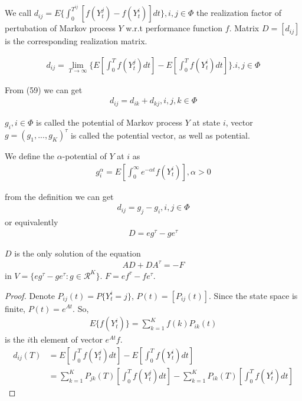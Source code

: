 \documentclass[runningheads]{llncs}
\begin{document}
    \begin{definition}
        We call $d_{ij} = E \{ \int_0^{T^{ij}} [ f(Y_t^j) - f(Y_t^i) ] dt \}, i, j \in \Phi$
        the realization factor of pertubation of Markov process $Y$ w.r.t performance function $f$.
        Matrix $D = [d_{ij}]$ is the corresponding realization matrix.
    \end{definition}

    \begin{lemma}
        \begin{align}
            d_{ij} = \mathop{\lim}_{T \rightarrow \infty} \{ E [ \int_0^T f(Y_t^j)dt ] -  E [ \int_0^T f(Y_t^i)dt ] \}. i, j \in \Phi
        \end{align}
    \end{lemma}
    \par
    From (59) we can get
    \begin{align}
        d_{ij} = d_{ik} + d_{kj}, i, j, k \in \Phi
    \end{align}
    \begin{definition}
        $g_i, i \in \Phi$ is called the potential of Markov process $Y$ at state $i$,
        vector $g = ( g_1, ..., g_K)^\tau$ is called the potential vector, as well as potential.
        \par
        We define the $\alpha$-potential of $Y$ at $i$ as
        \begin{align}
            g_i^\alpha = E [ \int_0^\infty e^{-\alpha t}f(Y_t^i)], \alpha > 0
        \end{align}
    \end{definition}
    from the definition we can get
    \begin{align}
        d_{ij} = g_j - g_i, i, j \in \Phi
    \end{align}
    or equivalently
    \begin{align}
        D = eg^\tau - ge^\tau
    \end{align}
    \begin{lemma}
        $D$ is the only solution of the equation
        \begin{align}
            AD + DA^\tau = -F
        \end{align}
        in $V = \{ eg^\tau - ge^\tau: g \in \mathcal{R}^K \}$.
        $F = ef^\tau - fe^\tau$.
    \end{lemma}
    \begin{proof}
        Denote $P_{ij}(t) = P \{ Y_t^i = j \}$, $P(t) = [P_{ij}(t)]$.
        Since the state space is finite, $P(t) = e^{At}$.
        So,
        \begin{align}
            E \{ f(Y_t^i) \} = \sum_{k=1}^K f(k) P_{ik}(t)
        \end{align}
        is the $i$th element of vector $e^{At} f$.
        \begin{align}
            d_{ij}(T) &= E [ \int_0^T f(Y_t^j)dt ] -  E [ \int_0^T f(Y_t^i)dt ] \\
            &= \sum_{k=1}^K P_{jk}(T) [ \int_0^T f(Y_t^j)dt ] -  \sum_{k=1}^K P_{ik}(T) [ \int_0^T f(Y_t^i)dt ]
        \end{align}
    \end{proof}

    
\end{document}
